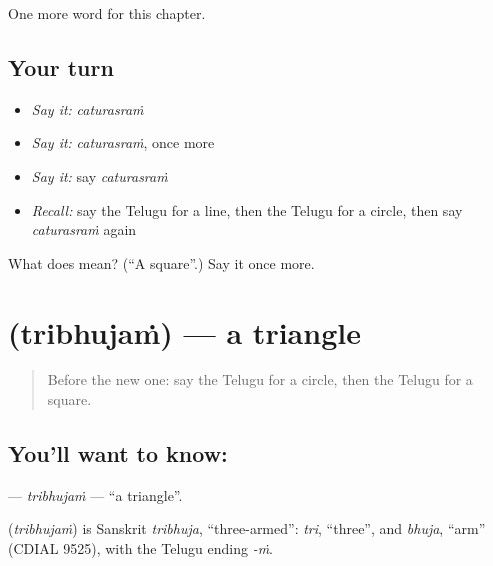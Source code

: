 \begin{grammarlens}[title={What you've built}]
One more word for this chapter.
\end{grammarlens}

\subsection*{Your turn}
\begin{itemize}
\raggedright
  \item \emph{Say it:} \emph{caturasraṁ}
  \item \emph{Say it:} \emph{caturasraṁ}, once more
  \item \emph{Say it:} say \emph{caturasraṁ}
  \item \emph{Recall:} say the Telugu for a line, then the Telugu for a circle, then say \emph{caturasraṁ} again
\end{itemize}

\begin{tcolorbox}[breakable,colback=teal!4,colframe=teal!35!black,title={Before you move on}]
What does  mean? (\textquotedblleft{}A square\textquotedblright{}.) Say it once more.
\end{tcolorbox}
\section[\texorpdfstring{\te{త్రిభుజం} (tribhujaṁ)}{త్రిభుజం (tribhujaṁ)}]{ (tribhujaṁ) — a triangle}

\label{lesson:TE-C193-tribhujam}



\begin{quote}
Before the new one: say the Telugu for a circle, then the Telugu for a square.
\end{quote}

\subsection*{You'll want to know: }
\textbf{} — \emph{tribhujaṁ} — \textquotedblleft{}a triangle\textquotedblright{}.

\begin{cousinweb}
\textbf{} (\emph{tribhujaṁ}) is Sanskrit \emph{tribhuja}, \textquotedblleft{}three-armed\textquotedblright{}: \emph{tri}, \textquotedblleft{}three\textquotedblright{}, and \emph{bhuja}, \textquotedblleft{}arm\textquotedblright{} (CDIAL 9525), with the Telugu ending \emph{-ṁ}.
\end{cousinweb}

